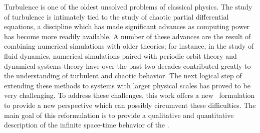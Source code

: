 
Turbulence is one of the oldest unsolved problems of classical
physics. The study of turbulence is intimately
tied to the study of chaotic partial differential equations, a discipline which
has made significant advances as computing power has become more readily available.
A number of these advances are the result of combining numerical simulations with older
theories; for instance, in the study of fluid dynamics, numerical
simulations paired with periodic orbit theory and dynamical systems theory
have over the past two decades
contributed greatly to the understanding of turbulent and chaotic behavior.
The next logical step of extending these methods to systems with larger physical scales has proved to be
very challenging. To address these challenges, this work offers a new \spt\ formulation
to provide a new perspective which can possibly circumvent these difficulties.
The main goal of this reformulation is to provide a qualitative and
quantitative description of the infinite space-time behavior
of the \KSe{}.
